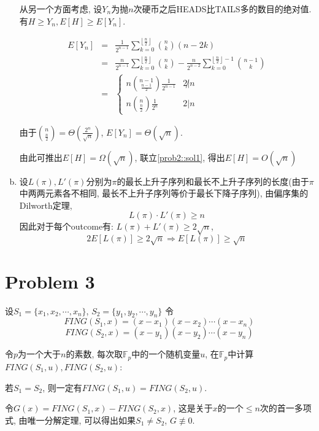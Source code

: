 \documentclass[paper=a4, fontsize=11pt]{scrartcl} %
\numberwithin{equation}{section} %
\numberwithin{figure}{section} %
\numberwithin{table}{section} %
\begin{document}
\begin{enumerate}[(a)]
		从另一个方面考虑, 设$Y_n$为抛$n$次硬币之后HEADS比TAILS多的数目的绝对值.\\
		有$H\geq Y_n, E[H] \geq E[Y_n]$.

		\begin{eqnarray}
			E[Y_n] &= &\frac{1}{2^{n-1}}\sum_{k=0}^{\left\lfloor\frac{n}{2}\right\rfloor}{n\choose k}(n - 2k) \\
				   &= &\frac{n}{2^{n-1}}\sum_{k=0}^{\left\lfloor\frac{n}{2}\right\rfloor}{n\choose k} - \frac{n}{2^{n-2}}\sum_{k=0}^{\left\lfloor\frac{n}{2}\right\rfloor - 1}{{n - 1}\choose k} \\
				   &= & \left\{\begin{array}{ll}
				   			n{n - 1\choose\frac{n-1}{2}}\frac{1}{2^{n-1}} & 2\not| n\\
				   			n{n\choose\frac{n}{2}}\frac{1}{2^{n}} & 2| n
				   		\end{array}\right.
		\end{eqnarray}

		由于${n \choose \frac{n}{2}} = \Theta\left(\frac{2^n}{\sqrt{n}}\right)$, $E[Y_n] = \Theta\left(\sqrt{n}\right)$.

		由此可推出$E[H] = \Omega\left(\sqrt{n}\right)$, 联立\eqref{prob2::sol1}, 得出$E[H] = O\left(\sqrt{n}\right)$
	\item
		设$L(\pi), L'(\pi)$分别为$\pi$的最长上升子序列和最长不上升子序列的长度(由于$\pi$中两两元素各不相同, 最长不上升子序列等价于最长下降子序列), 由偏序集的Dilworth定理, 
		$$L(\pi) \cdot L'(\pi) \geq n$$
		因此对于每个outcome有: $L(\pi) + L'(\pi) \geq 2\sqrt{n}$,
		$$2E[L(\pi)] \geq 2\sqrt{n} \Longrightarrow E[L(\pi)] \geq \sqrt{n}$$  
		

\end{enumerate}


\section*{Problem 3}
设$S_1 = \{x_1, x_2, \cdots, x_n\}$, $S_2 = \{y_1, y_2, \cdots, y_n\}$
令
$$FING(S_1, x) = (x - x_1)(x - x_2)\cdots(x-x_n)$$
$$FING(S_2, x) = (x - y_1)(x - y_2)\cdots(x-y_n)$$

令$p$为一个大于$n$的素数, 每次取$\mathbb{F}_p$中的一个随机变量$u$, 在$\mathbb{F}_p$中计算$FING(S_1, u), FING(S_2, u)$:

若$S_1 = S_2$, 则一定有$FING(S_1, u) = FING(S_2, u)$.

令$G(x) = FING(S_1, x) - FING(S_2, x)$, 这是关于$x$的一个$\leq n$次的首一多项式, 由唯一分解定理, 可以得出如果$S_1 \not= S_2$, $G \not\equiv 0$.
\end{document}
